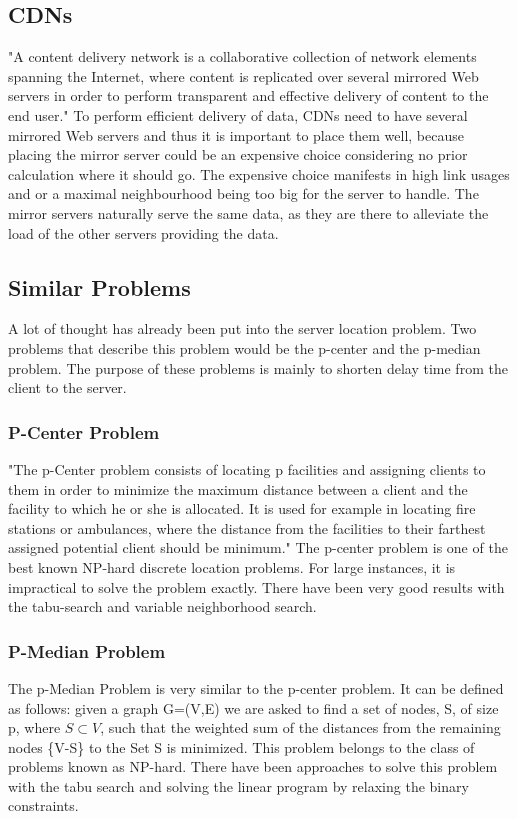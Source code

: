 \documentclass [12pt]{article}
\begin{document}
\subsection {CDNs}
"A content delivery network is a collaborative collection of network elements spanning
the Internet, where content is replicated over several mirrored Web servers in order
to perform transparent and effective delivery of content to the end user."\cite[p. 3]{Buyya:2008:CDN:1457653}
To perform efficient delivery of data, CDNs need to have several mirrored Web servers
and thus it is important to place them well, because placing the mirror server 
could be an expensive choice considering no prior calculation where it should go. 
The expensive choice manifests in high link usages and or a maximal neighbourhood being
too big for the server to handle.
The mirror servers naturally serve the same data, as they are there to alleviate the 
load of the other servers providing the data.

\subsection {Similar Problems}
A lot of thought has already been put into the server location problem.
Two problems that describe this problem would be the p-center and the
p-median problem. The purpose of these problems is mainly to shorten delay
time from the client to the server. 
\subsubsection {P-Center Problem}
"The p-Center problem consists of locating p facilities and assigning clients
to them in order to minimize the maximum distance between a client and the facility
to which he or she is allocated. It is used for example in locating fire stations or ambulances,
where the distance from the facilities 
to their farthest assigned potential client should be minimum."\cite{Mladenovic00solvingthe}
The p-center problem is one of the best known NP-hard discrete location problems.\cite{KarivHakimi1979}
For large instances, it is impractical to solve the problem exactly.
There have been very good results with the tabu-search and variable neighborhood search.
\cite{Mladenovic00solvingthe}
\subsubsection {P-Median Problem}
The p-Median Problem is very similar to the p-center problem. It can be defined as follows:
given a graph G=(V,E) we are asked to find a set of nodes, S, of size p, where $ S\subset V$, such that the weighted
sum of the distances from the remaining nodes \{V-S\} to the Set S is minimized. \cite{Rolland1997329}
This problem belongs to the class of problems known as NP-hard.\cite{KarivHakimi1979median} There have been
approaches to solve this problem with the tabu search \cite{Rolland1997329} and solving the linear program by
relaxing the binary constraints.\cite{rosing1979p}
\end{document}
